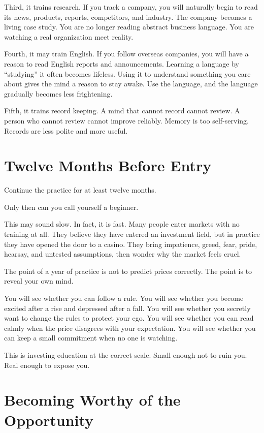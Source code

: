 Third, it trains research. If you track a company, you will naturally begin to read its news, products, reports, competitors, and industry. The company becomes a living case study. You are no longer reading abstract business language. You are watching a real organization meet reality.

Fourth, it may train English. If you follow overseas companies, you will have a reason to read English reports and announcements. Learning a language by ``studying'' it often becomes lifeless. Using it to understand something you care about gives the mind a reason to stay awake. Use the language, and the language gradually becomes less frightening.

Fifth, it trains record keeping. A mind that cannot record cannot review. A person who cannot review cannot improve reliably. Memory is too self-serving. Records are less polite and more useful.

\section*{Twelve Months Before Entry}

Continue the practice for at least twelve months.

Only then can you call yourself a beginner.

This may sound slow. In fact, it is fast. Many people enter markets with no training at all. They believe they have entered an investment field, but in practice they have opened the door to a casino. They bring impatience, greed, fear, pride, hearsay, and untested assumptions, then wonder why the market feels cruel.

The point of a year of practice is not to predict prices correctly. The point is to reveal your own mind.

You will see whether you can follow a rule. You will see whether you become excited after a rise and depressed after a fall. You will see whether you secretly want to change the rules to protect your ego. You will see whether you can read calmly when the price disagrees with your expectation. You will see whether you can keep a small commitment when no one is watching.

This is investing education at the correct scale. Small enough not to ruin you. Real enough to expose you.

\section*{Becoming Worthy of the Opportunity}

